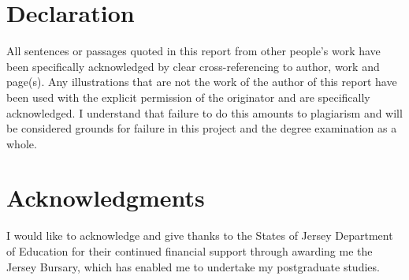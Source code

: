 \documentclass[a4paper,12pt,titlepage,openright]{report}
\begin{document}


\chapter*{Declaration}
All sentences or passages quoted in this report from other people's work have been specifically acknowledged by clear cross-referencing to author, work and page(s). Any illustrations that are not the work of the author of this report have been used with the explicit permission of the originator and are specifically acknowledged. I understand that failure to do this amounts to plagiarism and will be considered grounds for failure in this project and the degree examination as a whole.

\chapter*{Acknowledgments}
I would like to acknowledge and give thanks to the States of Jersey Department of Education for their continued financial support through awarding me the Jersey Bursary, which has enabled me to undertake my postgraduate studies. 

\tableofcontents
\cleardoublepage{}

 







\end{document}
